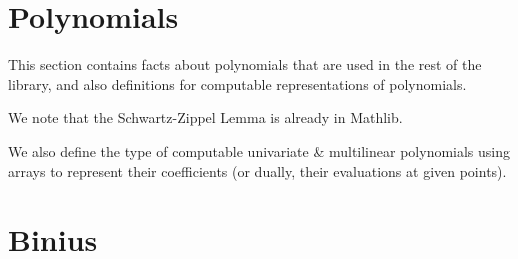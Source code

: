 \section{Polynomials}\label{sec:polynomials}

This section contains facts about polynomials that are used in the rest of the library, and also definitions for computable representations of polynomials.

\begin{definition}
    \label{def:multilinear_extension}
\end{definition}

\begin{theorem}
    \label{thm:multilinear_extension_unique}
\end{theorem}

We note that the Schwartz-Zippel Lemma is already in Mathlib.

\begin{theorem}
    \label{thm:schwartz_zippel}
\end{theorem}

We also define the type of computable univariate \& multilinear polynomials using arrays to represent their coefficients (or dually, their evaluations at given points).

\begin{definition}
    \label{def:computable_univariate_polynomials}
\end{definition}

\begin{definition}
    \label{def:computable_multilinear_polynomials}
\end{definition}


\section{Binius}\label{sec:binius}

